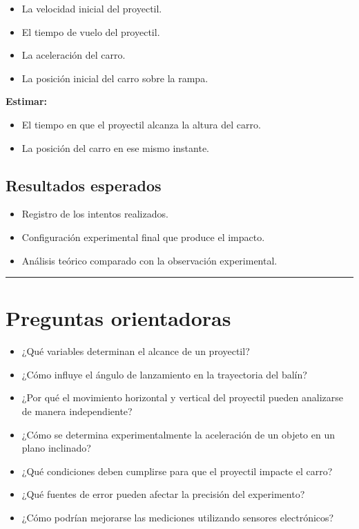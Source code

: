 \begin{itemize}
\item La velocidad inicial del proyectil.
\item El tiempo de vuelo del proyectil.
\item La aceleración del carro.
\item La posición inicial del carro sobre la rampa.
\end{itemize}

\textbf{Estimar:}

\begin{itemize}
\item El tiempo en que el proyectil alcanza la altura del carro.
\item La posición del carro en ese mismo instante.
\end{itemize}

\subsection*{Resultados esperados}

\begin{itemize}
\item Registro de los intentos realizados.
\item Configuración experimental final que produce el impacto.
\item Análisis teórico comparado con la observación experimental.
\end{itemize}

\rule{\textwidth}{1pt}

\section*{Preguntas orientadoras}

\begin{itemize}
\item ¿Qué variables determinan el alcance de un proyectil?
\item ¿Cómo influye el ángulo de lanzamiento en la trayectoria del balín?
\item ¿Por qué el movimiento horizontal y vertical del proyectil pueden analizarse de manera independiente?
\item ¿Cómo se determina experimentalmente la aceleración de un objeto en un plano inclinado?
\item ¿Qué condiciones deben cumplirse para que el proyectil impacte el carro?
\item ¿Qué fuentes de error pueden afectar la precisión del experimento?
\item ¿Cómo podrían mejorarse las mediciones utilizando sensores electrónicos?
\end{itemize}

